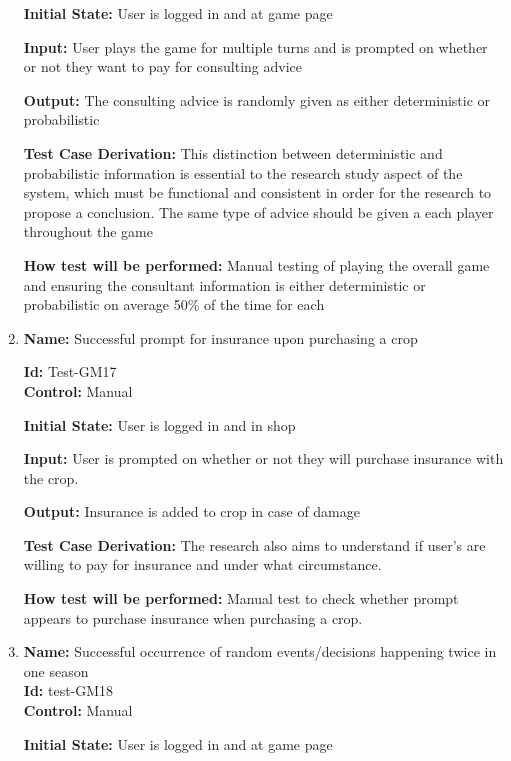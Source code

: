 \documentclass[12pt, titlepage]{article}
\begin{document}
\begin{enumerate}
\textbf{Initial State:} User is logged in and at game page
					
\textbf{Input:} User plays the game for multiple turns and is prompted on whether or not they want to pay for consulting advice
					
\textbf{Output:} The consulting advice is randomly given as either deterministic or probabilistic

\textbf{Test Case Derivation:} This distinction between deterministic and probabilistic information is essential to the research study aspect of the system, which must be functional and consistent in order for the research to propose a conclusion. The same type of advice should be given a each player throughout the game

\textbf{How test will be performed:} Manual testing of playing the overall game and ensuring the consultant information is either deterministic or probabilistic on average 50\% of the time for each

\item{\textbf{Name:} Successful prompt for insurance upon purchasing a crop \\} %

\textbf{Id:} Test-GM17 \label{Test-GM17}\\

\textbf{Control:} Manual 

\textbf{Initial State:} User is logged in and in shop

\textbf{Input:} User is prompted on whether or not they will purchase insurance with the crop.

\textbf{Output:} Insurance is added to crop in case of damage

\textbf{Test Case Derivation:} The research also aims to understand if user's are willing to pay for insurance and under what circumstance.

\textbf{How test will be performed:} Manual test to check whether prompt appears to purchase insurance when purchasing a crop.

\item{\textbf{Name:} Successful occurrence of random events/decisions happening twice in one season\\} %
\textbf{Id:} test-GM18 \label{Test-GM18}\\

\textbf{Control:} Manual
					
\textbf{Initial State: }User is logged in and at game page
					

\end{enumerate}
\end{document}
